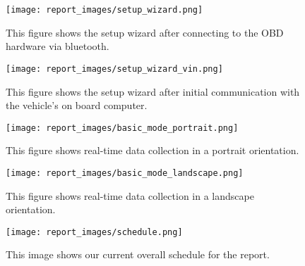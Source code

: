 \documentclass[12pt]{article}
\begin{document}
\begin{figure}[ht]
\begin{center}
\texttt{[image: report\_images/setup\_wizard.png]}
\caption{This figure shows the setup wizard after connecting to the OBD hardware via bluetooth.}
\label{diagram}
\end{center}
\end{figure}

\begin{figure}[ht]
\begin{center}
\texttt{[image: report\_images/setup\_wizard\_vin.png]}
\caption{This figure shows the setup wizard after initial communication with the vehicle's on board computer.}
\label{diagram}
\end{center}
\end{figure}

\begin{figure}[ht]
\begin{center}
\texttt{[image: report\_images/basic\_mode\_portrait.png]}
\caption{This figure shows real-time data collection in a portrait orientation.}
\label{diagram}
\end{center}
\end{figure}


\begin{figure}[ht]
\begin{center}
\texttt{[image: report\_images/basic\_mode\_landscape.png]}
\caption{This figure shows real-time data collection in a landscape orientation.}
\label{diagram}
\end{center}
\end{figure}

\begin{figure}[ht]
\begin{center}
\texttt{[image: report\_images/schedule.png]} 
\caption{This image shows our current overall schedule for the report.}
\label{schedule}
\end{center}
\end{figure}
\end{document}
